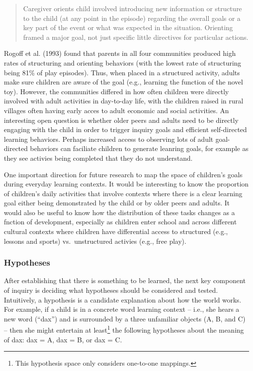\documentclass[english,floatsintext,man]{apa6}
\theoremstyle{definition}
\theoremstyle{definition}
\theoremstyle{definition}
\theoremstyle{remark}
\begin{document}
\begin{quote}
Caregiver orients child involved introducing new information or
structure to the child (at any point in the episode) regarding the
overall goals or a key part of the event or what was expected in the
situation. Orienting framed a major goal, not just specific little
directives for particular actions.
\end{quote}

\noindent
Rogoff et al. (1993) found that parents in all four communities produced
high rates of structuring and orienting behaviors (with the lowest rate
of structuring being 81\% of play episodes). Thus, when placed in a
structured activity, adults make sure children are aware of the goal
(e.g., learning the function of the novel toy). However, the communities
differed in how often children were directly involved with adult
activities in day-to-day life, with the children raised in rural
villages often having early acces to adult economic and social
activities. An interesting open question is whether older peers and
adults need to be directly engaging with the child in order to trigger
inquiry goals and efficient self-directed learning behaviors. Perhaps
increased access to observing lots of adult goal-directed behaviors can
faciliate children to generate leanring goals, for example as they see
activies being completed that they do not understand.

One important direction for future research to map the space of
children's goals during everyday learning contexts. It would be
interesting to know the proportion of children's daily activities that
involve contexts where there is a clear learning goal either being
demonstrated by the child or by older peers and adults. It would also be
useful to know how the distribution of these tasks changes as a fnction
of development, especially as children enter school and across different
cultural contexts where children have differential access to structured
(e.g., lessons and sports) vs.~unstructured activies (e.g., free play).

\subsubsection{Hypotheses}\label{hypotheses}

After establishing that there is something to be learned, the next key
component of inquiry is deciding what hypotheses should be considered
and tested. Intuitively, a hypothesis is a candidate explanation about
how the world works. For example, if a child is in a concrete word
learning context -- i.e., she hears a new word (\enquote{dax}) and is
surrounded by a three unfamiliar objects (A, B, and C) -- then she might
entertain at least\footnote{This hypothesis space only considers
  one-to-one mappings.} the following hypotheses about the meaning of
dax: dax = A, dax = B, or dax = C.
\end{document}
